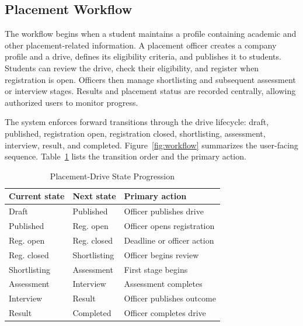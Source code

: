 \documentclass[conference,final]{IEEEtran}
\begin{document}
\subsection{Placement Workflow}
The workflow begins when a student maintains a profile containing academic and other placement-related information. A placement officer creates a company profile and a drive, defines its eligibility criteria, and publishes it to students. Students can review the drive, check their eligibility, and register when registration is open. Officers then manage shortlisting and subsequent assessment or interview stages. Results and placement status are recorded centrally, allowing authorized users to monitor progress.

The system enforces forward transitions through the drive lifecycle: draft, published, registration open, registration closed, shortlisting, assessment, interview, result, and completed. Figure~\ref{fig:workflow} summarizes the user-facing sequence. Table~\ref{tab:lifecycle} lists the transition order and the primary action.

\begin{table}[!t]
\caption{Placement-Drive State Progression}
\label{tab:lifecycle}
\centering
\footnotesize
\begin{tabular}{p{} p{} p{}}
\toprule
\textbf{Current state} & \textbf{Next state} & \textbf{Primary action} \\
\midrule
Draft & Published & Officer publishes drive \\
Published & Reg. open & Officer opens registration \\
Reg. open & Reg. closed & Deadline or officer action \\
Reg. closed & Shortlisting & Officer begins review \\
Shortlisting & Assessment & First stage begins \\
Assessment & Interview & Assessment completes \\
Interview & Result & Officer publishes outcome \\
Result & Completed & Officer completes drive \\
\bottomrule
\end{tabular}
\end{table}
\end{document}
